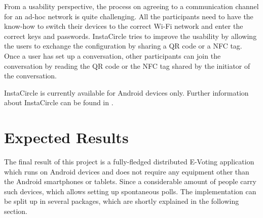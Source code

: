 \documentclass[numbers=noenddot, abstract=on]{scrreprt}
\begin{document}
From a usability perspective, the process on agreeing to a communication channel
for an ad-hoc network is quite challenging. All the participants need to have
the know-how to switch their devices to the correct Wi-Fi network and enter the
correct keys and passwords. InstaCircle tries to improve the usability by
allowing the users to exchange the configuration by sharing a QR code or a NFC
tag. Once a user has set up a conversation, other participants can join the
conversation by reading the QR code or the NFC tag shared by the initiator of
the conversation.

InstaCircle is currently available for Android devices only. Further information
about InstaCircle can be found in \cite{ritter13a}.

\chapter{Expected Results}
\label{cha:expectedresults}
The final result of this project is a fully-fledged distributed E-Voting
application which runs on Android devices and does not require any equipment
other than the Android smartphones or tablets. Since a considerable amount of
people carry such devices, which allows setting up spontaneous polls. The
implementation can be split up in several packages, which are shortly explained
in the following section.
\end{document}
